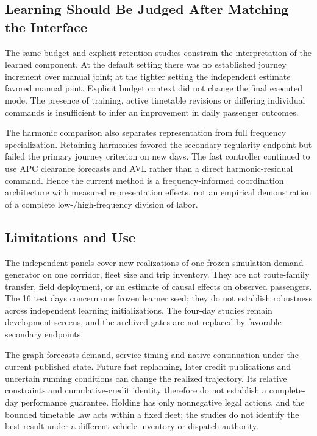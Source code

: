\subsection{Learning Should Be Judged After Matching the Interface}
The same-budget and explicit-retention studies constrain the interpretation of the learned component. At the default setting there was no established journey increment over manual joint; at the tighter setting the independent estimate favored manual joint. Explicit budget context did not change the final executed mode. The presence of training, active timetable revisions or differing individual commands is insufficient to infer an improvement in daily passenger outcomes.

The harmonic comparison also separates representation from full frequency specialization. Retaining harmonics favored the secondary regularity endpoint but failed the primary journey criterion on new days. The fast controller continued to use APC clearance forecasts and AVL rather than a direct harmonic-residual command. Hence the current method is a frequency-informed coordination architecture with measured representation effects, not an empirical demonstration of a complete low-/high-frequency division of labor.

\subsection{Limitations and Use}
\label{sec:limitations}
The independent panels cover new realizations of one frozen simulation-demand generator on one corridor, fleet size and trip inventory. They are not route-family transfer, field deployment, or an estimate of causal effects on observed passengers. The 16 test days concern one frozen learner seed; they do not establish robustness across independent learning initializations. The four-day studies remain development screens, and the archived gates are not replaced by favorable secondary endpoints.

The graph forecasts demand, service timing and native continuation under the current published state. Future fast replanning, later credit publications and uncertain running conditions can change the realized trajectory. Its relative constraints and cumulative-credit identity therefore do not establish a complete-day performance guarantee. Holding has only nonnegative legal actions, and the bounded timetable law acts within a fixed fleet; the studies do not identify the best result under a different vehicle inventory or dispatch authority.

